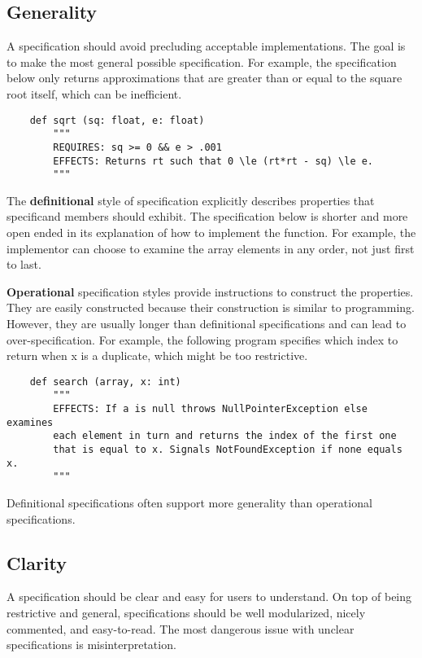 \documentclass[oneside,11pt,dvipsnames]{book}
\begin{document}
\subsection{Generality}
A specification should avoid precluding acceptable implementations. The goal is to make the most general possible specification. For example, the specification below only returns approximations that are greater than or equal to the square root itself, which can be inefficient.

\begin{lstlisting}
    def sqrt (sq: float, e: float)
        """
        REQUIRES: sq >= 0 && e > .001
        EFFECTS: Returns rt such that 0 \le (rt*rt - sq) \le e.
        """
\end{lstlisting}
The \textbf{definitional} style of specification explicitly describes properties that specificand members should exhibit. The specification below is shorter and more open ended in its explanation of how to implement the function. For example, the implementor can choose to examine the array elements in any order, not just first to last.

\textbf{Operational} specification styles provide instructions to construct the properties. They are easily constructed because their construction is similar to programming. However, they are usually longer than definitional specifications and can lead to over-specification. For example, the following program specifies which index to return when x is a duplicate, which might be too restrictive.
\begin{lstlisting}
    def search (array, x: int)
        """
        EFFECTS: If a is null throws NullPointerException else examines
        each element in turn and returns the index of the first one
        that is equal to x. Signals NotFoundException if none equals x.
        """

\end{lstlisting}

Definitional specifications often support more generality than operational specifications.

\subsection{Clarity}
A specification should be clear and easy for users to understand. On top of being restrictive and general, specifications should be well modularized, nicely commented, and easy-to-read. The most dangerous issue with unclear specifications is misinterpretation.
\end{document}
